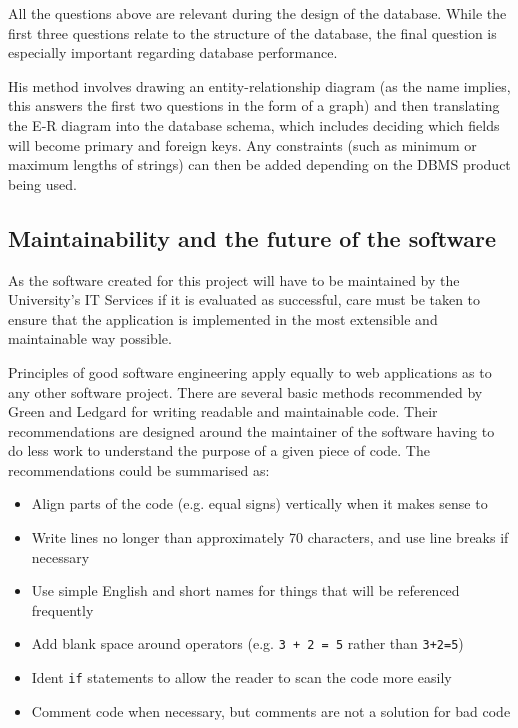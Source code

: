 \documentclass[]{scrartcl}
\begin{document}
All the questions above are relevant during the design of the database. While
the first three questions relate to the structure of the database, the final
question is especially important regarding database performance.

His method involves drawing an entity-relationship diagram (as the name
implies, this answers the first two questions in the form of a graph) and then
translating the E-R diagram into the database schema, which includes deciding
which fields will become primary and foreign keys. Any constraints (such as
minimum or maximum lengths of strings) can then be added depending on the DBMS
product being used.

\subsection{Maintainability and the future of the software}
\label{sec:maintainability}

As the software created for this project will have to be maintained by the
University's IT Services if it is evaluated as successful, care must be taken
to ensure that the application is implemented in the most extensible and
maintainable way possible.

Principles of good software engineering apply equally to web applications as
to any other software project. There are several basic methods recommended by
Green and Ledgard \cite{Green:2011:CGF:2063166.2063168} for writing readable
and maintainable code. Their recommendations are designed around the
maintainer of the software having to do less work to understand the purpose of
a given piece of code. The recommendations could be summarised as:

\begin{itemize}
  \item Align parts of the code (e.g. equal signs) vertically when it makes sense to
  \item Write lines no longer than approximately 70 characters, and use line breaks if necessary
  \item Use simple English and short names for things that will be referenced frequently
  \item Add blank space around operators (e.g. \texttt{3 + 2 = 5} rather than \texttt{3+2=5})
  \item Ident \texttt{if} statements to allow the reader to scan the code more easily
  \item Comment code when necessary, but comments are not a solution for bad code
\end{itemize}
\end{document}
